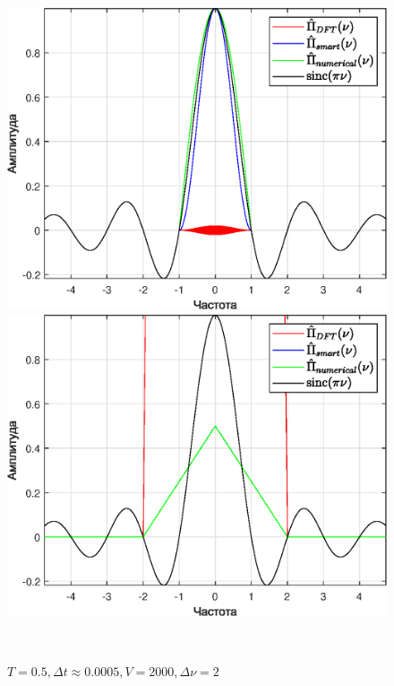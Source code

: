 \documentclass[a4paper]{article}
\begin{document}
\begin{figure}[H]
    \begin{minipage}{0.5\textwidth}
        \centering \includegraphics[width=\textwidth]{graphs/3/T_5000_dt_0.50005_V_2_dv_0.0002/fourier_combined_all.eps}
        \caption{$T = 5000, \Delta t \approx 0.5, V = 2, \Delta \nu = 0.0002$}
    \end{minipage}\hfill
    \begin{minipage}{0.5\textwidth}
        \centering \includegraphics[width=\textwidth]{graphs/3/T_0.5_dt_0.0005005_V_2000_dv_2/fourier_combined_all.eps}
        \caption{$T = 0.5, \Delta t \approx 0.0005, V = 2000, \Delta \nu = 2$}
    \end{minipage}\\[1em]
\end{figure}\noindent\
\end{document}

